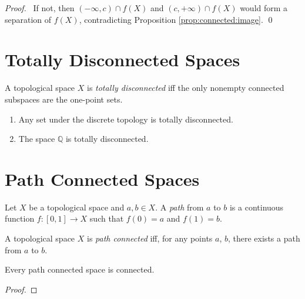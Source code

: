 \begin{proof}
  \pf\ If not, then $(- \infty, c) \cap f(X)$ and $(c, +\infty) \cap f(X)$ would form a separation of $f(X)$, contradicting Proposition \ref{prop:connected:image}. \qed
\end{proof}

\section{Totally Disconnected Spaces}

\begin{df}
  A topological space $X$ is \emph{totally disconnected} iff the only nonempty connected subspaces are the one-point sets.
\end{df}

\begin{ex}
  \begin{enumerate}
    \item Any set under the discrete topology is totally disconnected.
    \item The space $\mathbb{Q}$ is totally disconnected.
  \end{enumerate}
\end{ex}

\section{Path Connected Spaces}

\begin{df}[Path]
  Let $X$ be a topological space and $a, b \in X$. A \emph{path} from $a$ to $b$ is a continuous function $f : [0,1] \rightarrow X$ such that $f(0) = a$ and $f(1) = b$.
\end{df}

\begin{df}
  A topological space $X$ is \emph{path connected} iff, for any points $a$, $b$, there exists a path from $a$ to $b$.
\end{df}

\begin{prop}
  Every path connected space is connected.
\end{prop}

\begin{proof}
  \pf
  \qedstep
\end{proof}

